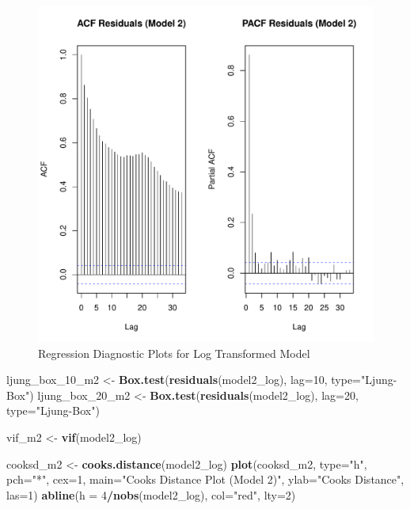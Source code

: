 \documentclass[
]{article}
\newenvironment{Shaded}{\begin{snugshade}}{\end{snugshade}}
\newcommand{\AttributeTok}[1]{\textcolor[rgb]{0.13,0.29,0.53}{#1}}
\newcommand{\DecValTok}[1]{\textcolor[rgb]{0.00,0.00,0.81}{#1}}
\newcommand{\FunctionTok}[1]{\textcolor[rgb]{0.13,0.29,0.53}{\textbf{#1}}}
\newcommand{\NormalTok}[1]{#1}
\newcommand{\OtherTok}[1]{\textcolor[rgb]{0.56,0.35,0.01}{#1}}
\newcommand{\SpecialCharTok}[1]{\textcolor[rgb]{0.81,0.36,0.00}{\textbf{#1}}}
\newcommand{\StringTok}[1]{\textcolor[rgb]{0.31,0.60,0.02}{#1}}
\begin{document}
\begin{figure}
\centering
\includegraphics{FinalProject_files/figure-latex/model2-diagnostics-4.pdf}
\caption{Regression Diagnostic Plots for Log Transformed Model}
\end{figure}

\begin{Shaded}
\begin{Highlighting}[]
\NormalTok{    ljung\_box\_10\_m2 }\OtherTok{\textless{}{-}} \FunctionTok{Box.test}\NormalTok{(}\FunctionTok{residuals}\NormalTok{(model2\_log), }\AttributeTok{lag=}\DecValTok{10}\NormalTok{, }\AttributeTok{type=}\StringTok{"Ljung{-}Box"}\NormalTok{)}
\NormalTok{    ljung\_box\_20\_m2 }\OtherTok{\textless{}{-}} \FunctionTok{Box.test}\NormalTok{(}\FunctionTok{residuals}\NormalTok{(model2\_log), }\AttributeTok{lag=}\DecValTok{20}\NormalTok{, }\AttributeTok{type=}\StringTok{"Ljung{-}Box"}\NormalTok{)}
      
\NormalTok{    vif\_m2 }\OtherTok{\textless{}{-}} \FunctionTok{vif}\NormalTok{(model2\_log)}
      
\NormalTok{    cooksd\_m2 }\OtherTok{\textless{}{-}} \FunctionTok{cooks.distance}\NormalTok{(model2\_log)}
    \FunctionTok{plot}\NormalTok{(cooksd\_m2, }\AttributeTok{type=}\StringTok{"h"}\NormalTok{, }\AttributeTok{pch=}\StringTok{"*"}\NormalTok{, }\AttributeTok{cex=}\DecValTok{1}\NormalTok{, }\AttributeTok{main=}\StringTok{"Cook\textquotesingle{}s Distance Plot (Model 2)"}\NormalTok{, }\AttributeTok{ylab=}\StringTok{"Cook\textquotesingle{}s Distance"}\NormalTok{, }\AttributeTok{las=}\DecValTok{1}\NormalTok{)}
    \FunctionTok{abline}\NormalTok{(}\AttributeTok{h =} \DecValTok{4}\SpecialCharTok{/}\FunctionTok{nobs}\NormalTok{(model2\_log), }\AttributeTok{col=}\StringTok{"red"}\NormalTok{, }\AttributeTok{lty=}\DecValTok{2}\NormalTok{) }
\end{Highlighting}
\end{Shaded}
\end{document}
